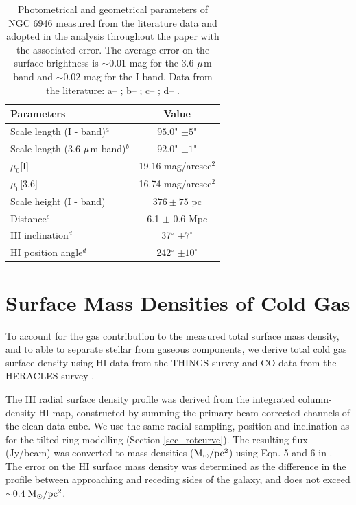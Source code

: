 \documentclass[fleqn,usenatbib]{mnras}
\begin{document}
\begin{table} %
\begin{tabular}{l c }
\hline 
 Parameters & Value  \\
\hline
Scale length (I - band)$^a$ & $95.0$" $\pm 5$" \\
Scale length (3.6 $\rm \mu$m band)$^b$ & $92.0$" $\pm 1$"  \\
$\mu_{0}$[I] & 19.16 mag/arcsec$^{2}$ \\
$\mu_{0}$[3.6] & 16.74 mag/arcsec$^{2}$ \\
Scale height (I - band)& $376 \pm 75$ pc  \\
Distance$^c$ & 6.1 $\pm$ 0.6 Mpc \\
HI inclination$^d$ & 37$^\circ$ $\pm 7^\circ$ \\
HI position angle$^d$ & 242$^\circ$ $\pm 10^\circ$ \\
\hline
\end{tabular}
\caption{Photometrical and geometrical parameters of NGC 6946 measured from the literature data and adopted in the analysis throughout the paper with the associated error. The average error on the surface brightness is $\sim$0.01 mag for the 3.6 $\rm \mu$m band and $\sim$0.02 mag for the I-band. Data from the literature:
a-- \citet{Makarova:99}; b-- \citet{munoz:09}; c-- \citet{HC1}; d-- \citet{things}. 
 }
\label{par_N6946}
\end{table}

\section{Surface Mass Densities of Cold Gas}  %
To account for the gas contribution %
to the measured total surface mass density, and to able to separate stellar from gaseous components, we derive total cold gas surface 
density using HI data from the THINGS survey \citep{things} and CO data from the HERACLES survey \citep{heracles}. 

The HI radial surface density profile was derived from the integrated column-density HI map, constructed by summing the primary beam corrected channels of the clean data cube. 
We use the same radial sampling, position and inclination as for the tilted ring modelling (Section \ref{sec_rotcurve}). The resulting flux (Jy/beam) was converted to mass densities ($\rm M_{\odot}/\rm pc^2$) using Eqn. 5 and 6 in \citet{ponomareva16}. The error on the HI surface mass density was determined as the difference in the profile between approaching and receding sides of the galaxy, and does not exceed $\sim 0.4~$$\rm M_{\odot}/\rm pc^2$.
\end{document}

